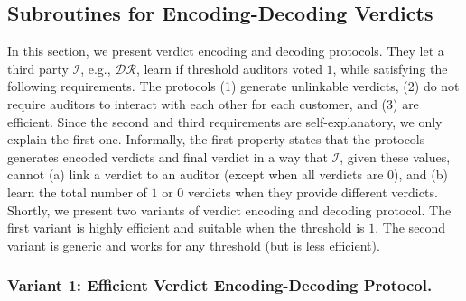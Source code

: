 
\vspace{.6mm}
\subsection{Subroutines for  Encoding-Decoding Verdicts}\label{sec::Encoding-Decoding-Verdicts}

\vspace{-1mm}

In this section, we present verdict encoding and decoding protocols. They let a third party $\mathcal{I}$, e.g., $\mathcal{DR}$, learn if threshold  auditors voted $1$, while satisfying the following  requirements.  The protocols  (1) generate unlinkable verdicts, (2) do not require auditors to interact with each other for each customer, and (3) are  efficient. Since the second and third requirements are self-explanatory,  we only explain the first one.  Informally, the first property states  that the protocols  generates encoded verdicts and final verdict in a way that $\mathcal{I}$,  given these values, cannot (a)   link a  verdict to an auditor (except when all verdicts are $0$), and (b) learn the total number of $1$ or $0$ verdicts when they provide different verdicts.  Shortly, we present two variants of verdict encoding and decoding protocol. The first variant is highly efficient and suitable when the threshold is $1$. The second variant is  generic and works for any threshold (but is  less efficient). 


\vspace{-2mm}
\subsubsection{Variant 1:  Efficient Verdict  Encoding-Decoding Protocol.}



